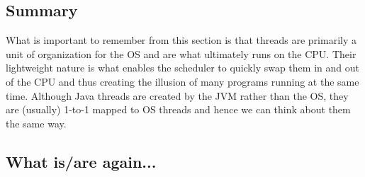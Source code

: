 \documentclass[main]{subfiles}
\begin{document}
\subsection{Summary}
What is important to remember from this section is that threads are primarily a unit of organization for the OS and are what ultimately runs on the CPU. Their lightweight nature is what enables the scheduler to quickly swap them in and out of the CPU and thus creating the illusion of many programs running at the same time. Although Java threads are created by the JVM rather than the OS, they are (usually) 1-to-1 mapped to OS threads and hence we can think about them the same way.

\subsection{What is/are again...}
\end{document}
